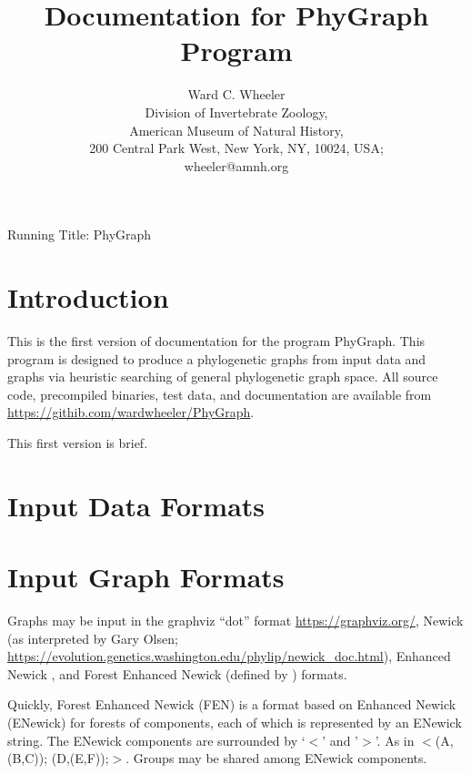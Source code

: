 \documentclass[11pt]{memoir}
\begin{document}
	
	\title{Documentation for PhyGraph Program}
	\author{Ward C. Wheeler\\
		Division of Invertebrate Zoology,\\ American Museum of Natural History,\\ 200 Central Park West, New York, NY, 10024, USA;\\wheeler@amnh.org}
	
	
	\maketitle
	\begin{center}
		Running Title: PhyGraph
	\end{center}
	\newpage
	
	
	\section{Introduction}
	This is the first version of documentation for the program PhyGraph.  This program is designed to produce a phylogenetic graphs from input data and graphs via heuristic searching of general phylogenetic graph space.
	All source code, precompiled binaries, test data, and documentation are available from \url{https://githib.com/wardwheeler/PhyGraph}.
	
	This first version is brief.
	
	\section{Input Data Formats}
	
	\section{Input Graph Formats}
	Graphs may be input in the graphviz ``dot'' format \url{https://graphviz.org/}, Newick (as interpreted by Gary Olsen; \url{https://evolution.genetics.washington.edu/phylip/newick_doc.html}), Enhanced Newick \cite{Cardonaetal2008},
	and Forest Enhanced Newick (defined by \citealp{WheelerPhyloSuperGraphs}) formats.
	
	Quickly, Forest Enhanced Newick (FEN) is a format based on Enhanced Newick (ENewick) for forests of components, each
	of which is represented by an ENewick string.  The ENewick components are surrounded by `$<$' and '$>$'.
	As in $<$(A, (B,C)); (D,(E,F));$>$.  Groups may be shared among ENewick components.
	
\end{document}
